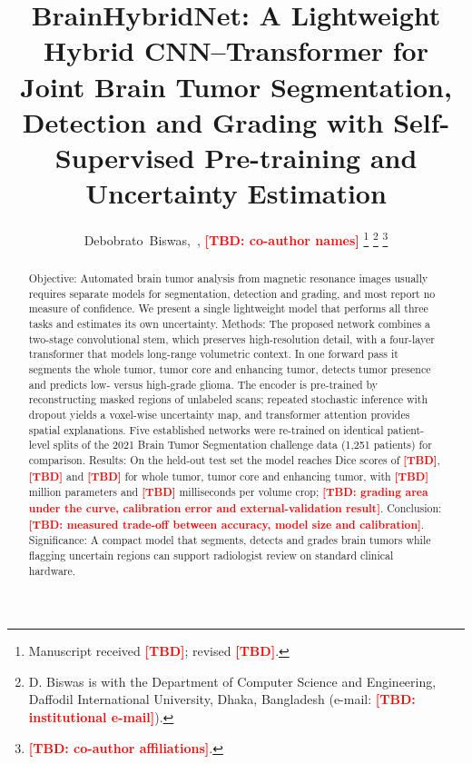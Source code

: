 \documentclass[journal]{IEEEtran}
\newcommand{\tbd}[1][]{\textcolor{red}{\textbf{[TBD#1]}}}
\begin{document}
\title{BrainHybridNet: A Lightweight Hybrid CNN--Transformer for Joint Brain Tumor Segmentation, Detection and Grading with Self-Supervised Pre-training and Uncertainty Estimation}

\author{Debobrato~Biswas,~\IEEEmembership{\tbd[: IEEE membership or remove]},
\tbd[: co-author names]
\thanks{Manuscript received \tbd; revised \tbd.}
\thanks{D. Biswas is with the Department of Computer Science and Engineering, Daffodil International University, Dhaka, Bangladesh (e-mail: \tbd[: institutional e-mail]).}
\thanks{\tbd[: co-author affiliations].}}


\maketitle

\begin{abstract}
Objective: Automated brain tumor analysis from magnetic resonance images usually requires separate models for segmentation, detection and grading, and most report no measure of confidence. We present a single lightweight model that performs all three tasks and estimates its own uncertainty. Methods: The proposed network combines a two-stage convolutional stem, which preserves high-resolution detail, with a four-layer transformer that models long-range volumetric context. In one forward pass it segments the whole tumor, tumor core and enhancing tumor, detects tumor presence and predicts low- versus high-grade glioma. The encoder is pre-trained by reconstructing masked regions of unlabeled scans; repeated stochastic inference with dropout yields a voxel-wise uncertainty map, and transformer attention provides spatial explanations. Five established networks were re-trained on identical patient-level splits of the 2021 Brain Tumor Segmentation challenge data (1,251 patients) for comparison. Results: On the held-out test set the model reaches Dice scores of \tbd{}, \tbd{} and \tbd{} for whole tumor, tumor core and enhancing tumor, with \tbd{} million parameters and \tbd{} milliseconds per volume crop; \tbd[: grading area under the curve, calibration error and external-validation result]. Conclusion: \tbd[: measured trade-off between accuracy, model size and calibration]. Significance: A compact model that segments, detects and grades brain tumors while flagging uncertain regions can support radiologist review on standard clinical hardware.
\end{abstract}
\end{document}

